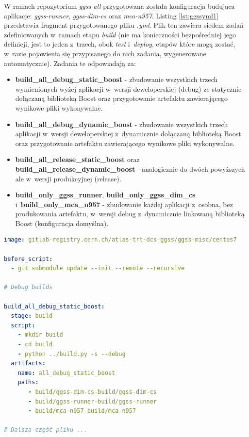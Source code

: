 W ramach repozytorium \textit{ggss-all} przygotowana została konfiguracja budująca aplikacje: \textit{ggss-runner}, \textit{ggss-dim-cs} oraz \textit{mca-n957}. Listing \ref{lst:ggssyml1} przedstawia fragment przygotowanego pliku \textit{.yml}. Plik ten zawiera siedem zadań zdefiniowanych w~ramach etapu \textit{build} (nie ma konieczności bezpośredniej jego definicji, jest to jeden z~trzech, obok \textit{test} i~\textit{deploy}, etapów które mogą zostać, w~razie pojawienia się przypisanego do nich zadania, wygenerowane automatycznie). Zadania te odpowiadają za:
\begin{itemize}
\item \textbf{build\_all\_debug\_static\_boost} - zbudowanie wszystkich trzech wymienionych wyżej aplikacji w~wersji deweloperskiej (debug) ze statycznie dołączaną biblioteką Boost oraz przygotowanie artefaktu zawierającego wynikowe pliki wykonywalne.
\item \textbf{build\_all\_debug\_dynamic\_boost} - zbudowanie wszystkich trzech aplikacji w~wersji deweloperskiej z~dynamicznie dołączaną biblioteką Boost oraz przygotowanie artefaktu zawierającego wynikowe pliki wykonywalne.
\item \textbf{build\_all\_release\_static\_boost} oraz \textbf{build\_all\_release\_dynamic\_boost} - analogicznie do dwóch powyższych ale w~wersji produkcyjnej (release).
\item \textbf{build\_only\_ggss\_runner}, \textbf{build\_only\_ggss\_dim\_cs} i~\textbf{build\_only\_mca\_n957} - zbudowanie każdej aplikacji z~osobna, bez produkowania artefaktu, w~wersji debug z~dynamicznie linkowaną biblioteką Boost (konfiguracja domyślna).
\end{itemize}

\begin{lstlisting}[language=yaml, caption={Fragment pliku \textit{.gitlab-ci.yml} konfigurującego \textit{pipeline} CI/CD dla repozytorium \textit{ggss-all}}, label={lst:ggssyml1}]
image: gitlab-registry.cern.ch/atlas-trt-dcs-ggss/ggss-misc/centos7

before_script:
  - git submodule update --init --remote --recursive

# Debug builds 

build_all_debug_static_boost:
  stage: build
  script:
    - mkdir build
    - cd build
    - python ../build.py -s --debug
  artifacts:
    name: all_debug_static_boost
    paths:
       - build/ggss-dim-cs-build/ggss-dim-cs
       - build/ggss-runner-build/ggss-runner
       - build/mca-n957-build/mca-n957

# Dalsza część pliku ...

\end{lstlisting}

